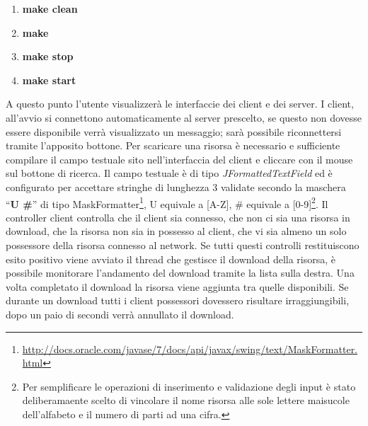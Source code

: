 \documentclass[
10pt, %
a4paper, %
oneside, %
BCOR5mm, %
]{scrartcl}
\begin{document}
		\begin{enumerate}
			\item  \textbf{make clean}
			\item  \textbf{make}
			\item  \textbf{make stop}
			\item  \textbf{make start}
		\end{enumerate}

	A questo punto l'utente visualizzerà le interfaccie dei client e dei server. I client, all'avvio si connettono automaticamente al server prescelto, se questo non dovesse essere disponibile verrà visualizzato un messaggio; sarà possibile riconnettersi tramite l'apposito bottone.
	Per scaricare una risorsa è necessario e sufficiente compilare il campo testuale sito nell'interfaccia del client e cliccare con il mouse sul bottone di ricerca. Il campo testuale è di tipo \emph{JFormattedTextField} ed è configurato per accettare stringhe di lunghezza 3 validate secondo la maschera ``\textbf{U \#}'' di tipo  MaskFormatter\footnote{\href{http://docs.oracle.com/javase/7/docs/api/javax/swing/text/MaskFormatter.html}{http://docs.oracle.com/javase/7/docs/api/javax/swing/text/MaskFormatter.html}}, U equivale a [A-Z], \# equivale a [0-9]\footnote{Per semplificare le operazioni di inserimento e validazione degli input è stato deliberamaente scelto di vincolare il nome risorsa alle sole lettere maisucole dell'alfabeto e il numero di parti ad una cifra.}.
	Il controller client controlla che il client sia connesso, che non ci sia una risorsa in download, che la risorsa non sia in possesso al client, che vi sia almeno un solo possessore della risorsa connesso al network. Se tutti questi controlli restituiscono esito positivo viene avviato il thread che gestisce il download della risorsa, è possibile monitorare l'andamento del download tramite la lista sulla destra. Una volta completato il download la risorsa viene aggiunta tra quelle disponibili. Se durante un download tutti i client possessori dovessero risultare irraggiungibili, dopo un paio di secondi verrà annullato il download.
\end{document}
